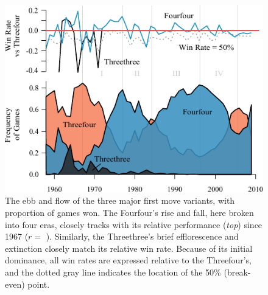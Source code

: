 \documentclass[reqno,12pt]{amsart}
\begin{document}
\begin{figure}[t]
  \begin{center}
    \includegraphics[scale=1.2]{./assets/m1FreqsWins.pdf}
    \caption{The ebb and flow of the three major first move variants, with proportion of games won. The Fourfour's rise and fall, here broken into four eras, closely tracks with its relative performance (\textit{top}) since 1967 ($r=$ \corFourFourFrqWin{}). Similarly, the Threethree's brief efflorescence and extinction closely match its relative win rate. Because of its initial dominance, all win rates are expressed relative to the Threefour's, and the dotted gray line indicates the location of the 50\% (break-even) point.}
    \label{fig:m1FreqsWins}
  \end{center}
\end{figure}
\end{document}
